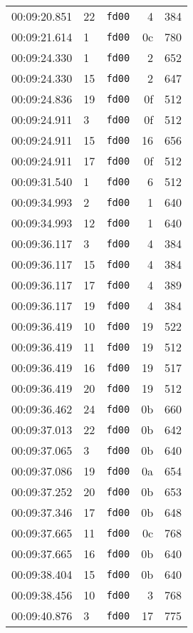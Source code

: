 \documentclass{article}
\begin{document}
\begin{longtable}{lllrr}
00:09:20.851 & 22 & \texttt{fd00} & 4 & 384 \\
00:09:21.614 & 1 & \texttt{fd00} & 0c & 780 \\
00:09:24.330 & 1 & \texttt{fd00} & 2 & 652 \\
00:09:24.330 & 15 & \texttt{fd00} & 2 & 647 \\
00:09:24.836 & 19 & \texttt{fd00} & 0f & 512 \\
00:09:24.911 & 3 & \texttt{fd00} & 0f & 512 \\
00:09:24.911 & 15 & \texttt{fd00} & 16 & 656 \\
00:09:24.911 & 17 & \texttt{fd00} & 0f & 512 \\
00:09:31.540 & 1 & \texttt{fd00} & 6 & 512 \\
00:09:34.993 & 2 & \texttt{fd00} & 1 & 640 \\
00:09:34.993 & 12 & \texttt{fd00} & 1 & 640 \\
00:09:36.117 & 3 & \texttt{fd00} & 4 & 384 \\
00:09:36.117 & 15 & \texttt{fd00} & 4 & 384 \\
00:09:36.117 & 17 & \texttt{fd00} & 4 & 389 \\
00:09:36.117 & 19 & \texttt{fd00} & 4 & 384 \\
00:09:36.419 & 10 & \texttt{fd00} & 19 & 522 \\
00:09:36.419 & 11 & \texttt{fd00} & 19 & 512 \\
00:09:36.419 & 16 & \texttt{fd00} & 19 & 517 \\
00:09:36.419 & 20 & \texttt{fd00} & 19 & 512 \\
00:09:36.462 & 24 & \texttt{fd00} & 0b & 660 \\
00:09:37.013 & 22 & \texttt{fd00} & 0b & 642 \\
00:09:37.065 & 3 & \texttt{fd00} & 0b & 640 \\
00:09:37.086 & 19 & \texttt{fd00} & 0a & 654 \\
00:09:37.252 & 20 & \texttt{fd00} & 0b & 653 \\
00:09:37.346 & 17 & \texttt{fd00} & 0b & 648 \\
00:09:37.665 & 11 & \texttt{fd00} & 0c & 768 \\
00:09:37.665 & 16 & \texttt{fd00} & 0b & 640 \\
00:09:38.404 & 15 & \texttt{fd00} & 0b & 640 \\
00:09:38.456 & 10 & \texttt{fd00} & 3 & 768 \\
00:09:40.876 & 3 & \texttt{fd00} & 17 & 775 \\

\end{longtable}
\end{document}

